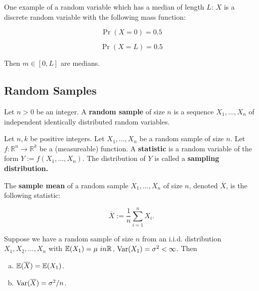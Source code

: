 \begin{remark} One example of a random variable which has a median of length \(L\): \(X\) is a discrete random variable with the following mass function:

\[
\Pr(X = 0) = 0.5
\]

\[
\Pr(X = L) = 0.5
\]

Then \(m \in [0, L]\) are medians.

\end{remark}

\subsection{Random Samples}

\begin{definition} Let \(n >0\) be an integer.  A \textbf{random sample} of size \(n\) is a sequence \(X_1, \ldots, X_n\) of independent identically distributed random variables.

\end{definition}

\begin{definition} Let \(n, k\) be positive integers. Let \(X_1, \ldots, X_n\) be a random sample of size \(n\). Let \(f: \mathbb{R}^n \to \mathbb{R}^k\) be a (measureable) function. A \textbf{statistic} is a random variable of the form \(Y:= f(X_1, \ldots, X_n)\). The distribution of \(Y\) is called a \textbf{sampling distribution.}

\end{definition}

\begin{definition} The \textbf{sample mean} of a random sample \(X_1, \ldots, X_n\) of size \(n\), denoted \(\overline{X}\), is the following statistic:

\[
\overline{X} := \frac{1}{n} \sum_{i=1}^n X_i.
\]

\end{definition}

\begin{proposition}\label{mathstats.sample.mean.props} Suppose we have a random sample of size \(n\) from an i.i.d. distribution \(X_1, X_2, \ldots, X_n\) with \(\E(X_1) = \mu \ in \mathbb{R}\), \(\Var(X_1) = \sigma^2 < \infty\). Then

\begin{enumerate}[(a)]

\item \(\E(\overline{X}) = \E(X_1)\).

\item \( \Var(\overline{X}) = \sigma^2/n\).

\end{enumerate}

\end{proposition}


